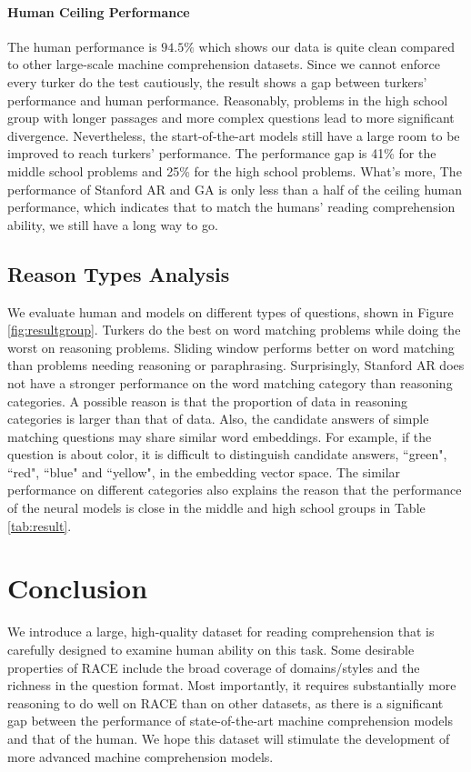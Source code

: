 \paragraph{Human Ceiling Performance} The human performance is $94.5\%$ which shows our data is quite clean compared to other large-scale machine comprehension datasets.  Since we cannot enforce every turker do the test cautiously, the result shows a gap between turkers' performance and human performance. Reasonably, problems in the high school group with longer passages and more complex questions lead to more significant divergence. Nevertheless, the start-of-the-art models still have a large room to be improved to reach turkers' performance. The performance gap is 41\% for the middle school problems and 25\% for the high school problems. What's more, The performance of Stanford AR and GA is only less than a half of the ceiling human performance, which indicates that to match the humans' reading comprehension ability, we still have a long way to go. 

\subsection{Reason Types Analysis} We evaluate human and models on different types of questions, shown in Figure \ref{fig:resultgroup}. Turkers do the best on word matching problems while doing the worst on reasoning problems. Sliding window performs better on word matching than problems needing reasoning or paraphrasing. Surprisingly, Stanford AR does not have a stronger performance on the word matching category than reasoning categories. A possible reason is that the proportion of data in reasoning categories is larger than that of data. Also, the candidate answers of simple matching questions may share similar word embeddings. For example, if the question is about color, it is difficult to distinguish candidate answers, ``green", ``red", ``blue" and ``yellow", in the embedding vector space. The similar performance on different categories also explains the reason that the performance of the neural models is close in the middle and high school groups in Table \ref{tab:result}.

\section{Conclusion}
We introduce a large, high-quality dataset for reading comprehension that is carefully designed to examine human ability on this task. Some desirable properties of RACE include the broad coverage of domains/styles and the richness in the question format. Most importantly, it requires substantially more reasoning to do well on RACE than on other datasets, as there is a significant gap between the performance of state-of-the-art machine comprehension models and that of the human. We hope this dataset will stimulate the development of more advanced machine comprehension models.  

\label{sec:conclusion}


